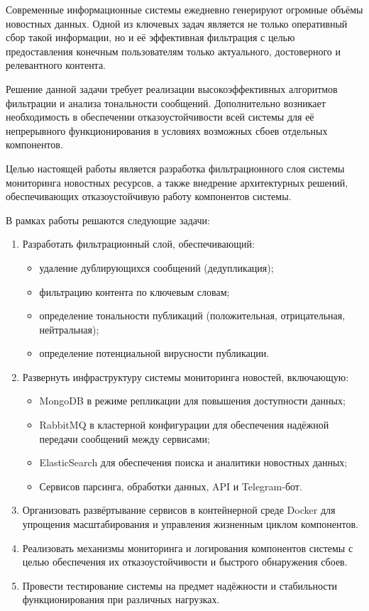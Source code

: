 \newpage


Современные информационные системы ежедневно генерируют огромные объёмы новостных данных.
Одной из ключевых задач является не только оперативный сбор такой информации, но и её эффективная фильтрация с целью предоставления конечным пользователям только актуального, достоверного и релевантного контента.

Решение данной задачи требует реализации высокоэффективных алгоритмов фильтрации и анализа тональности сообщений.
Дополнительно возникает необходимость в обеспечении отказоустойчивости всей системы для её непрерывного функционирования в условиях возможных сбоев отдельных компонентов.

Целью настоящей работы является разработка фильтрационного слоя системы мониторинга новостных ресурсов, а также внедрение архитектурных решений, обеспечивающих отказоустойчивую работу компонентов системы.

В рамках работы решаются следующие задачи:
\begin{enumerate}
    \item Разработать фильтрационный слой, обеспечивающий:
    \begin{itemize}
        \item удаление дублирующихся сообщений (дедупликация);
        \item фильтрацию контента по ключевым словам;
        \item определение тональности публикаций (положительная, отрицательная, нейтральная);
        \item определение потенциальной вирусности публикации.
    \end{itemize}
    \item Развернуть инфраструктуру системы мониторинга новостей, включающую:
    \begin{itemize}
        \item MongoDB в режиме репликации для повышения доступности данных;
        \item RabbitMQ в кластерной конфигурации для обеспечения надёжной передачи сообщений между сервисами;
        \item ElasticSearch для обеспечения поиска и аналитики новостных данных;
        \item Сервисов парсинга, обработки данных, API и Telegram-бот.
    \end{itemize}
    \item Организовать развёртывание сервисов в контейнерной среде Docker для упрощения масштабирования и управления жизненным циклом компонентов.
    \item Реализовать механизмы мониторинга и логирования компонентов системы с целью обеспечения их отказоустойчивости и быстрого обнаружения сбоев.
    \item Провести тестирование системы на предмет надёжности и стабильности функционирования при различных нагрузках.
\end{enumerate}

